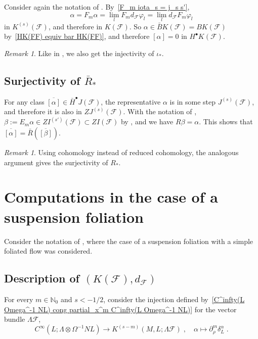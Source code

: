 \documentclass{memo-l}
\theoremstyle{plain}
\theoremstyle{definition}
\theoremstyle{remark}
\newtheorem{rem}[thm]{Remark}
\newcommand{\N}{\mathbb{N}}
\newcommand{\FF}{\mathcal{F}}
\numberwithin{section}{chapter}
\numberwithin{equation}{section}%
\begin{document}
Consider again the notation of . By~\eqref{F_m iota_s = j_s s'},
\[
\alpha=F_m\alpha=\lim_lF_md_\FF\varphi_l=\lim_ld_\FF F_m\varphi_l
\]
in $K^{(s)}(\FF)$, and therefore in $K(\FF)$. So $\alpha\in\bar BK(\FF)=BK(\FF)$ by~\eqref{HK(FF) equiv bar HK(FF)}, and therefore $[\alpha]=0$ in $H^\bullet K(\FF)$.

\begin{rem}\label{r: injectivity of iota_*}
Like in , we also get the injectivity of $\iota_*$.
 \end{rem}


\subsection{Surjectivity of $\bar R_*$}\label{ss: surjectivity of bar R_*}

For any class $\overline{[\alpha]}\in\bar H^\bullet J(\FF)$, the representative $\alpha$ is in some step $J^{(s)}(\FF)$, and therefore it is also in $ZJ^{(s)}(\FF)$. With the notation of , $\beta:=E_m\alpha\in ZI^{(s')}(\FF)\subset  ZI(\FF)$ by , and we have $R\beta=\alpha$. This shows that $\overline{[\alpha]}=\bar R(\overline{[\beta]})$.

 \begin{rem}\label{r: ker R_* subset im iota_*}
Using cohomology instead of reduced cohomology, the analogous argument gives the surjectivity of $R_*$.
 \end{rem}



\section{Computations in the case of a suspension foliation}\label{s: computations suspension foln}

Consider the notation of , where the case of a suspension foliation with a simple foliated flow was considered.


\subsection{Description of $(K(\FF),d_{\FF})$}\label{ss: (K(Lambda FF) d_FF)}

For every $m\in\N_0$ and $s<-1/2$, consider the injection defined by~\eqref{C^infty(L Omega^-1 NL) cong partial_x^m C^infty(L Omega^-1 NL)} for the vector bundle $\Lambda\FF$, 
\begin{equation}\label{alpha mapsto partial_rho^m delta_M^0^alpha}
C^\infty(L;\Lambda\otimes\Omega^{-1}NL) \to K^{(s-m)}(M,L;\Lambda\FF)\;,\quad \alpha\mapsto\partial_\rho^m\delta_L^\alpha\;.
\end{equation}
\end{document}

